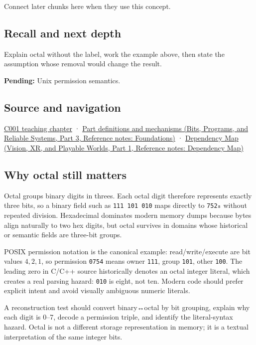 Connect later chunks here when they use this concept.

\subsection{Recall and next depth}\label{appendix-17fc1bc8b305-recall-and-next-depth}

\hypertarget{appendix-17fc1bc8b305-recall-and-next-depth}{}

Explain octal without the label, work the example above, then state the assumption whose removal would change the result.

\textbf{Pending:} Unix permission semantics.

\subsection{Source and navigation}\label{appendix-17fc1bc8b305-source-and-navigation}

\hypertarget{appendix-17fc1bc8b305-source-and-navigation}{}

\hyperref[01-foundations-i-ch001-from-a-signal-to-an-interpretation]{C001 teaching chapter} · \href{../01-Bits-Programs-and-Reliable-Systems-P03/main.pdf\#nameddest=appendix-fd090d982a15}{Part definitions and mechanisms (Bits, Programs, and Reliable Systems, Part 3, Reference notes: Foundations)} · \href{../07-Vision-XR-and-Playable-Worlds-P01/main.pdf\#nameddest=appendix-4ad47bdd269a}{Dependency Map (Vision, XR, and Playable Worlds, Part 1, Reference notes: Dependency Map)}

\subsection{Why octal still matters}\label{appendix-17fc1bc8b305-why-octal-still-matters}

\hypertarget{appendix-17fc1bc8b305-why-octal-still-matters}{}

Octal groups binary digits in threes. Each octal digit therefore represents exactly three bits, so a binary field such as \texttt{111\ 101\ 010} maps directly to \texttt{752₈} without repeated division. Hexadecimal dominates modern memory dumps because bytes align naturally to two hex digits, but octal survives in domains whose historical or semantic fields are three-bit groups.

POSIX permission notation is the canonical example: read/write/execute are bit values \(4,2,1\), so permission \texttt{0754} means owner \texttt{111}, group \texttt{101}, other \texttt{100}. The leading zero in C/C++ source historically denotes an octal integer literal, which creates a real parsing hazard: \texttt{010} is eight, not ten. Modern code should prefer explicit intent and avoid visually ambiguous numeric literals.

A reconstruction test should convert binary↔octal by bit grouping, explain why each digit is 0--7, decode a permission triple, and identify the literal-syntax hazard. Octal is not a different storage representation in memory; it is a textual interpretation of the same integer bits.
